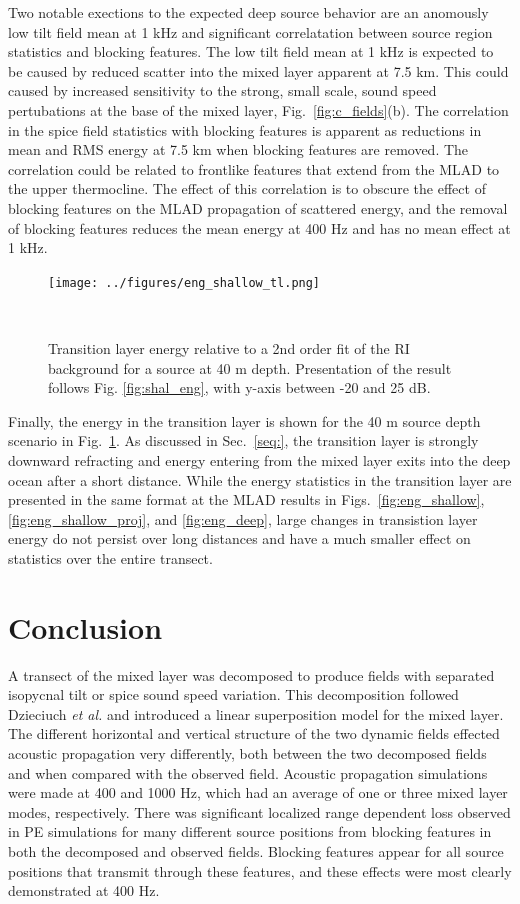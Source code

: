 \documentclass[preprint,NumberedRefs]{JASA}
\begin{document}
Two notable exections to the expected deep source behavior are an anomously low tilt field mean at 1 kHz and significant correlatation between source region statistics and blocking features. The low tilt field mean at 1 kHz is expected to be caused by reduced scatter into the mixed layer apparent at 7.5 km. This could caused by increased sensitivity to the strong, small scale, sound speed pertubations at the base of the mixed layer, Fig.~\ref{fig:c_fields}(b). The correlation in the spice field statistics with blocking features is apparent as reductions in mean and RMS energy at 7.5 km when blocking features are removed. The correlation could be related to frontlike features that extend from the MLAD to the upper thermocline. The effect of this correlation is to obscure the effect of blocking features on the MLAD propagation of scattered energy, and the removal of blocking features reduces the mean energy at 400 Hz and has no mean effect at 1 kHz.

\begin{figure}
\texttt{[image: ../figures/eng\_shallow\_tl.png]}
        \caption{Transition layer energy relative to a 2nd order fit of the RI background for a source at 40 m depth. Presentation of the result follows Fig. \ref{fig:shal_eng}, with y-axis between -20 and 25 dB.}
    \label{fig:eng_tl}
\end{figure}
Finally, the energy in the transition layer is shown for the 40 m source depth scenario in Fig.~\ref{fig:eng_tl}. As discussed in Sec.~\ref{seq:}, the transition layer is strongly downward refracting and energy entering from the mixed layer exits into the deep ocean after a short distance. While the energy statistics in the transition layer are presented in the same format at the MLAD results in Figs.~\ref{fig:eng_shallow}, \ref{fig:eng_shallow_proj}, and \ref{fig:eng_deep}, large changes in transistion layer energy do not persist over long distances and have a much smaller effect on statistics over the entire transect.

\section{Conclusion}\label{sec:conclusion}
A transect of the mixed layer was decomposed to produce fields with separated isopycnal tilt or spice sound speed variation. This decomposition followed Dzieciuch \emph{et al.}\citep{dzieciuch2004} and introduced a linear superposition model for the mixed layer. The different horizontal and vertical structure of the two dynamic fields effected acoustic propagation very differently, both between the two decomposed fields and when compared with the observed field. Acoustic propagation simulations were made at 400 and 1000 Hz, which had an average of one or three mixed layer modes, respectively. There was significant localized range dependent loss observed in PE simulations for many different source positions from blocking features in both the decomposed and observed fields. Blocking features appear for all source positions that transmit through these features, and these effects were most clearly demonstrated at 400 Hz.
\end{document}
